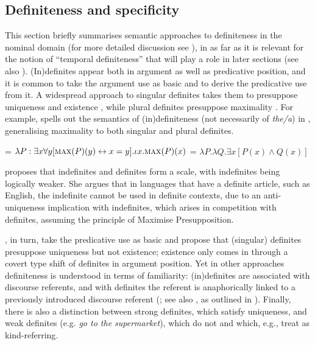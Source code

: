\documentclass[output=paper,colorlinks,citecolor=brown]{langscibook}
\begin{document}
\subsection{Definiteness and specificity}
\label{sec:defspec}

This section briefly summarises semantic approaches to definiteness in the nominal domain (for more detailed discussion see ), in as far as it is relevant for the notion of ``temporal definiteness'' that will play a role in later sections (see also ). (In)definites appear both in argument as well as predicative position, and it is common to take the argument use as basic and to derive the predicative use from it. A widespread approach to singular definites takes them to presuppose uniqueness and existence \citep[following][]{frege92,strawson50}, while plural definites presuppose maximality \citep[following][]{sharvy80}. For example, \citet{heim11} spells out the semantics of (in)definiteness (not necessarily of \textit{the/a}) in , generalising maximality to both singular and plural definites. 

\ea\label{ex:heimsemindef}
\ea {} = $\lambda P:\exists x \forall y [\textsc{max}(P)(y) \leftrightarrow x = y].\iota x.\textsc{max}(P)(x)$
\ex {} = $\lambda P.\lambda Q.\exists x[P(x) \wedge Q(x)]$
\z 
\z 

\noindent \citeauthor{heim11} proposes that indefinites and definites form a scale, with indefinites being logically weaker. She argues that in languages that have a definite article, such as English, the indefinite cannot be used in definite contexts, due to an anti-uniqueness implication with indefinites, which arises in competition with definites, assuming the principle of Maximise Presupposition. 

\citet{coppockbeaver15}, in turn, take the predicative use as basic and propose that (singular) definites presuppose uniqueness but not existence; existence only comes in through a covert type shift of definites in argument position. Yet in other approaches definiteness is understood in terms of familiarity: (in)definites are associated with discourse referents, and with definites the referent is anaphorically linked to a previously introduced discourse referent (\citealt{kamp81,Heim1982}; see also \citealt{gronnstechow16}, as outlined in ). Finally, there is also a distinction between strong definites, which satisfy uniqueness, and weak definites (e.g. \textit{go to the supermarket}), which do not and which, e.g., \citet{aguilarzwarts11} treat as kind-referring.
\end{document}
